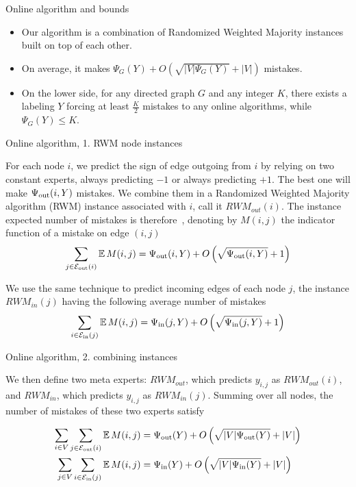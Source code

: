 \documentclass[10pt,svgnames,ignorenonframetext,final]{beamer}
\providecommand{\largelist}{%
  \setlength{\itemsep}{8pt}\setlength{\parskip}{3pt}}
\begin{document}
\begin{frame}{Online algorithm and bounds}
  \begin{itemize}[<+->]
    \largelist
  \item 
    Our algorithm is a combination of Randomized Weighted Majority instances built on top of each other. 

  \item 
    On average, it makes $\Psi_G(Y) + O\left(\sqrt{|V|\Psi_G(Y)} + |V|\right)$ mistakes.

  \item 
    On the lower side,
    for any directed graph $G$ and any integer $K$,
    there exists a labeling $Y$ forcing at least $\frac{K}{2}$ mistakes to any online algorithms,
    while $\Psi_G(Y) \leq K$.
\end{itemize}

\end{frame}

\begin{frame}{Online algorithm, 1. RWM node instances}

For each node \(i\), we predict the sign of edge outgoing from \(i\) by
relying on two constant experts, always predicting \(-1\) or always
predicting \(+1\). The best one will make \(\Psi_{\mathrm{out}}(i, Y)\) mistakes. We
combine them in a Randomized Weighted Majority algorithm (RWM) instance
associated with \(i\), call it \(RWM_{out}(i)\). The instance expected
number of mistakes is therefore~\autocite{acg02},
denoting by \(M(i,j)\) the indicator function of a mistake on edge
\((i,j)\)
\[\sum_{j \in \mathcal{E}_{\mathrm{out}}(i)} \mathbb{E}\,M(i,j) = \Psi_{\mathrm{out}}(i,Y) + O\left(\sqrt{\Psi_{\mathrm{out}}(i,Y)}+ 1\right)\]

We use the same technique to predict incoming edges of each node \(j\),
the instance \(RWM_{in}(j)\) having the following average number of
mistakes
\[\sum_{i \in \mathcal{E}_{\mathrm{in}}(j)} \mathbb{E}\,M(i,j) = \Psi_{\mathrm{in}}(j,Y) + O\left(\sqrt{\Psi_{\mathrm{in}}(j,Y)} + 1\right)\]

\end{frame}

\begin{frame}{Online algorithm, 2. combining instances}

We then define two meta experts: \(RWM_{out}\), which predicts
\(y_{i,j}\) as \(RWM_{out}(i)\), and \(RWM_{in}\), which predicts
\(y_{i,j}\) as \(RWM_{in}(j)\). Summing over all nodes, the number of
mistakes of these two experts satisfy

\begin{align*}
    \sum_{i \in V}\sum_{j \in \mathcal{E}_{\mathrm{out}}(i)} \mathbb{E}\,M(i,j) &= \Psi_{\mathrm{out}}(Y) + O\left(\sqrt{|V|\Psi_{\mathrm{out}}(Y)} + |V|\right) \\
    \sum_{j \in V}\sum_{i \in \mathcal{E}_{\mathrm{in}}(j)} \mathbb{E}\,M(i,j)  &= \Psi_{\mathrm{in}}(Y)  + O\left(\sqrt{|V|\Psi_{\mathrm{in}}(Y)}  + |V|\right)
\end{align*}
\end{frame}
\end{document}
